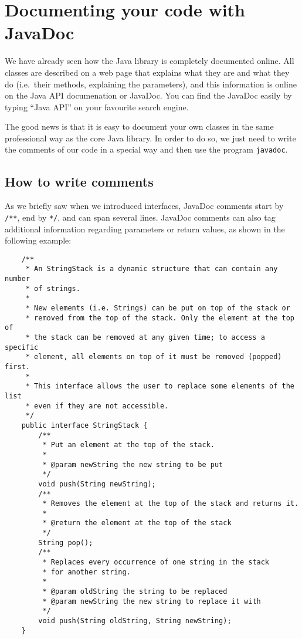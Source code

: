 \section{Documenting your code with JavaDoc}
\label{sec:docum-your-code}


We have already seen how the Java library is completely documented
online. All classes are described on a web page that explains
what they are and what they do (i.e.~their
methods, explaining the parameters), and this information is online on
the Java API documenation or JavaDoc. You can find the JavaDoc easily
by typing ``Java API'' on your favourite search engine. 

The good news is that it is easy to document your own classes in the
same professional way as the core Java library. In order to do so, we
just need to write the comments of our code in a special way and then
use the program \verb+javadoc+. 

\subsection{How to write comments}
\label{sec:writing-comments}

As we briefly saw when we introduced interfaces, JavaDoc comments
start by \verb+/**+, end by \verb+*/+, and can span several
lines. JavaDoc comments can also tag additional information regarding
parameters or return values, as shown in the following example: 

\begin{verbatim}
    /**
     * An StringStack is a dynamic structure that can contain any number
     * of strings. 
     * 
     * New elements (i.e. Strings) can be put on top of the stack or
     * removed from the top of the stack. Only the element at the top of
     * the stack can be removed at any given time; to access a specific 
     * element, all elements on top of it must be removed (popped) first. 
     * 
     * This interface allows the user to replace some elements of the list
     * even if they are not accessible. 
     */
    public interface StringStack {
        /**
         * Put an element at the top of the stack. 
         *
         * @param newString the new string to be put
         */
        void push(String newString);
        /**
         * Removes the element at the top of the stack and returns it. 
         *
         * @return the element at the top of the stack
         */
        String pop();
        /**
         * Replaces every occurrence of one string in the stack
         * for another string. 
         *
         * @param oldString the string to be replaced
         * @param newString the new string to replace it with
         */
        void push(String oldString, String newString);
    }
\end{verbatim}

